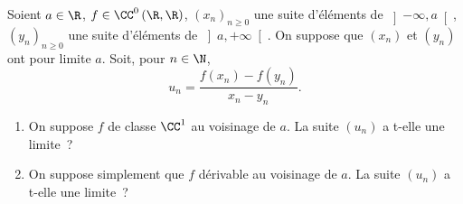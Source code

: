 \begin{enonce}
\begin{exercise}[ID={RMS123 E839, Centrale PSI},subtitle={Centrale PSI},tags={mpsi}]
Soient $a\in\R$, $f\in\CC^0\left( \R,\R \right)$,   $\left( x_n \right)_{n\geq0}$ une suite d'éléments de $\left]-\infty,a\right[$, $\left( y_n \right)_{n\geq0}$ une suite d'éléments de $\left]a,+\infty\right[$.
On suppose que $\left( x_n \right)$ et $\left( y_n \right)$ ont pour limite $a$.
Soit, pour $n\in\N$,
\begin{equation*}
  u_n=\frac{f(x_n)-f(y_n)}{x_n-y_n}.
\end{equation*}
\begin{enumerate}
  \item On suppose $f$ de classe $\CC^1$ au voisinage de $a$.
    La suite $\left( u_n \right)$ a t-elle une limite~?
  \item On suppose simplement que $f$ dérivable au voisinage de $a$.
    La suite $\left( u_n \right)$ a t-elle une limite~?
\end{enumerate}
\end{exercise}
\begin{solution}
\end{solution}
\end{enonce}
